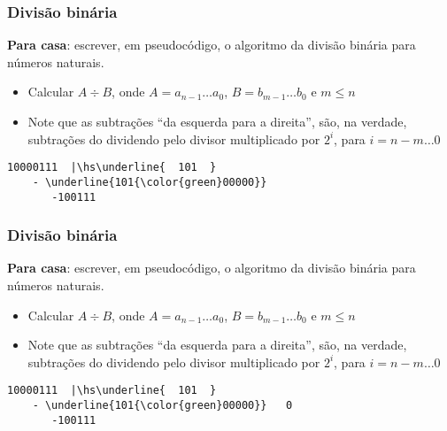 \documentclass{beamer}
\begin{document}
\begin{frame}[fragile]
\frametitle{Divisão binária}

\textbf{Para casa}: escrever, em pseudocódigo, o algoritmo da divisão binária para números naturais.

\begin{itemize}
\item Calcular $A \div B$, onde $A = a_{n-1} \ldots a_0$, $B = b_{m-1} \ldots b_0$ e $m \le n$
\item Note que as subtrações ``da esquerda para a direita'', são, na verdade, subtrações do dividendo pelo divisor multiplicado por $2^i$, para $i = n-m \ldots 0$
\end{itemize}

\def\hs{\hspace{-1mm}}

\begin{Verbatim}[commandchars=\\\{\},codes={\catcode`$=3\catcode`^=7}]
      10000111  |\hs\underline{  101  }
    - \underline{101{\color{green}00000}}
       -100111
\end{Verbatim}

\vspace{44pt}

\end{frame}


\begin{frame}[fragile]
\frametitle{Divisão binária}

\textbf{Para casa}: escrever, em pseudocódigo, o algoritmo da divisão binária para números naturais.

\begin{itemize}
\item Calcular $A \div B$, onde $A = a_{n-1} \ldots a_0$, $B = b_{m-1} \ldots b_0$ e $m \le n$
\item Note que as subtrações ``da esquerda para a direita'', são, na verdade, subtrações do dividendo pelo divisor multiplicado por $2^i$, para $i = n-m \ldots 0$
\end{itemize}

\def\hs{\hspace{-1mm}}

\begin{Verbatim}[commandchars=\\\{\},codes={\catcode`$=3\catcode`^=7}]
      10000111  |\hs\underline{  101  }
    - \underline{101{\color{green}00000}}   0
       -100111
\end{Verbatim}

\vspace{44pt}

\end{frame}
\end{document}
